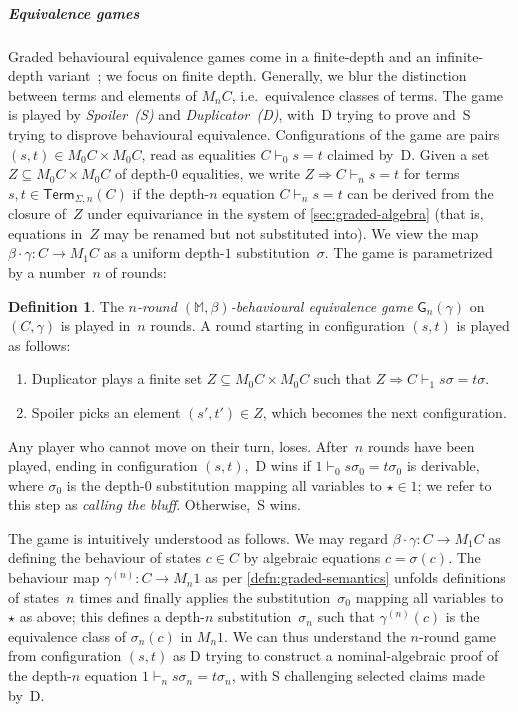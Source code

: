 \documentclass[a4paper,UKenglish,cleveref,thm-restate,numberwithinsect,final]{lipics-v2021}
\newcommand{\Term}{\mathsf{Term}}
\newcommand{\centails}{\Rightarrow}
\newcommand{\game}{\mathsf{G}}
\newcommand{\pow}{\mathcal{P}}
\newcommand{\powf}{\pow_{\omega}}
\theoremstyle{plain}
\numberwithin{equation}{section}
\newcommand{\monad}{{\mathbb{M}}}
\newcommand{\+}[1]{\mathcal{#1}\xspace}
\theoremstyle{definition}
\newtheorem{defn}[theorem]{Definition}
\begin{document}
\subparagraph*{Equivalence games} Graded behavioural equivalence games
come in a finite-depth and an infinite-depth
variant~\cite{FordEA22}; %
we focus on finite depth. Generally, we blur the distinction between
terms and elements of $M_nC$, i.e.~equivalence classes of terms.  The
game is played by \emph{Spoiler~(S)} and \emph{Duplicator~(D)}, with~D
trying to prove and~S trying to disprove behavioural
equivalence. Configurations of the game are pairs
$(s,t)\in M_0C\times M_0C$, read as equalities $C\vdash_0 s=t$ claimed
by~D. Given a set $Z\subseteq M_0C\times M_0C$ of depth-$0$
equalities, we write $Z\centails C\vdash_n s=t$ for terms
$s,t\in\Term_{\Sigma, n}(C)$ if the depth-$n$ equation $C\vdash_n s=t$
can be derived from the closure of~$Z$ under equivariance in the
system of \cref{sec:graded-algebra} (that is, equations in~$Z$ may be
renamed but not substituted into). We view the map
$\beta\cdot\gamma\colon C\to M_1C$ as a uniform depth-$1$
substitution~$\sigma$. The game is parametrized by a number~$n$ of
rounds: %

\begin{defn}
  The \emph{$n$-round $(\monad,\beta)$-behavioural equivalence game}
  $\game_n(\gamma)$ on~$(C,\gamma)$ is played in~$n$ rounds. A round
  starting in configuration $(s,t)$ is played as follows:
  \begin{enumerate}
  \item Duplicator plays a finite set $Z\subseteq M_0C\times M_0C$ such
    that $Z\centails C\vdash_1 s\sigma=t\sigma$.
  \item Spoiler picks an element $(s',t')\in Z$, which becomes the next
    configuration.
  \end{enumerate}
  Any player who cannot move on their turn, loses. After~$n$ rounds
  have been played, ending in configuration $(s,t)$,~D wins if
  $1\vdash_0 s\sigma_0=t\sigma_0$ is derivable, where $\sigma_0$ is the
  depth-$0$ substitution mapping all variables to $\star\in 1$; we
  refer to this step as \emph{calling the bluff}. Otherwise,~S wins.
\end{defn}
The game is intuitively understood as follows. We may regard
$\beta\cdot\gamma\colon C\to M_1C$ as defining the behaviour of states
$c\in C$ by algebraic equations $c=\sigma(c)$.  The behaviour map
$\gamma^{(n)}\colon C\to M_n1$ as per \cref{defn:graded-semantics}
unfolds definitions of states~$n$ times and finally applies the
substitution~$\sigma_0$ mapping all variables to $\star$ as above;
this defines a depth-$n$ substitution~$\sigma_n$ such that
$\gamma^{(n)}(c)$ is the equivalence class of $\sigma_n(c)$ in
$M_n1$. We can thus understand the $n$-round game from configuration
$(s,t)$ as D trying to construct a nominal-algebraic proof of the
depth-$n$ equation $1\vdash_n s\sigma_n=t\sigma_n$, with S challenging
selected claims made by~D.
\end{document}
